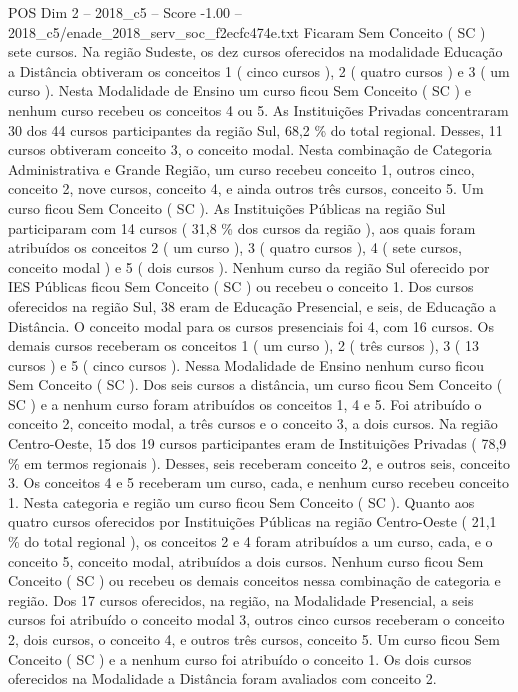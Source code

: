 \begin{textsample}{POS Dim 2 – 2018\_c5 – Score -1.00 – 2018\_c5/enade\_2018\_serv\_soc\_f2ecfc474e.txt}
Ficaram Sem Conceito ( SC ) sete cursos.
Na região Sudeste, os dez cursos oferecidos na modalidade Educação a Distância obtiveram os conceitos 1 ( cinco cursos ), 2 ( quatro cursos ) e 3 ( um curso ).
Nesta Modalidade de Ensino um curso ficou Sem Conceito ( SC ) e nenhum curso recebeu os conceitos 4 ou 5.
As Instituições Privadas concentraram 30 dos 44 cursos participantes da região Sul, 68,2 \% do total regional.
Desses, 11 cursos obtiveram conceito 3, o conceito modal.
Nesta combinação de Categoria Administrativa e Grande Região, um curso recebeu conceito 1, outros cinco, conceito 2, nove cursos, conceito 4, e ainda outros três cursos, conceito 5.
Um curso ficou Sem Conceito ( SC ).
As Instituições Públicas na região Sul participaram com 14 cursos ( 31,8 \% dos cursos da região ), aos quais foram atribuídos os conceitos 2 ( um curso ), 3 ( quatro cursos ), 4 ( sete cursos, conceito modal ) e 5 ( dois cursos ).
Nenhum curso da região Sul oferecido por IES Públicas ficou Sem Conceito ( SC ) ou recebeu o conceito 1.
Dos cursos oferecidos na região Sul, 38 eram de Educação Presencial, e seis, de Educação a Distância.
O conceito modal para os cursos presenciais foi 4, com 16 cursos.
Os demais cursos receberam os conceitos 1 ( um curso ), 2 ( três cursos ), 3 ( 13 cursos ) e 5 ( cinco cursos ).
Nessa Modalidade de Ensino nenhum curso ficou Sem Conceito ( SC ).
Dos seis cursos a distância, um curso ficou Sem Conceito ( SC ) e a nenhum curso foram atribuídos os conceitos 1, 4 e 5.
Foi atribuído o conceito 2, conceito modal, a três cursos e o conceito 3, a dois cursos.
Na região Centro-Oeste, 15 dos 19 cursos participantes eram de Instituições Privadas ( 78,9 \% em termos regionais ).
Desses, seis receberam conceito 2, e outros seis, conceito 3.
Os conceitos 4 e 5 receberam um curso, cada, e nenhum curso recebeu conceito 1.
Nesta categoria e região um curso ficou Sem Conceito ( SC ).
Quanto aos quatro cursos oferecidos por Instituições Públicas na região Centro-Oeste ( 21,1 \% do total regional ), os conceitos 2 e 4 foram atribuídos a um curso, cada, e o conceito 5, conceito modal, atribuídos a dois cursos.
Nenhum curso ficou Sem Conceito ( SC ) ou recebeu os demais conceitos nessa combinação de categoria e região.
Dos 17 cursos oferecidos, na região, na Modalidade Presencial, a seis cursos foi atribuído o conceito modal 3, outros cinco cursos receberam o conceito 2, dois cursos, o conceito 4, e outros três cursos, conceito 5.
Um curso ficou Sem Conceito ( SC ) e a nenhum curso foi atribuído o conceito 1.
Os dois cursos oferecidos na Modalidade a Distância foram avaliados com conceito 2.

\end{textsample}
